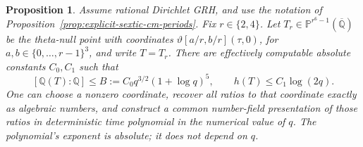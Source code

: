 \documentclass[11pt]{article}
\newtheorem{proposition}[theorem]{Proposition}
\theoremstyle{definition}
\theoremstyle{remark}
\begin{document}
\begin{proposition}\label{prop:sextic-theta-recognition}
Assume rational Dirichlet GRH, and use the notation of
Proposition~\ref{prop:explicit-sextic-cm-periods}.
Fix \(r\in\{2,4\}\). Let
\(T_r\in\mathbb P^{r^6-1}(\overline{\mathbb Q})\) be the theta-null point
with coordinates
\(\vartheta[a/r,b/r](\tau,0)\), for
\(a,b\in\{0,\ldots,r-1\}^3\), and write \(T=T_r\).
There are effectively computable absolute constants \(C_0,C_1\) such that
\[
 [\mathbb Q(T):\mathbb Q]
 \leq B:=C_0q^{3/2}(1+\log q)^5,
 \qquad h(T)\leq C_1\log(2q).
\]
One can choose a nonzero coordinate, recover all ratios to that
coordinate exactly as algebraic numbers, and construct a common
number-field presentation of those ratios in deterministic time
polynomial in the numerical value of \(q\).
The polynomial's exponent is absolute; it does not depend on \(q\).
\end{proposition}
\end{document}
